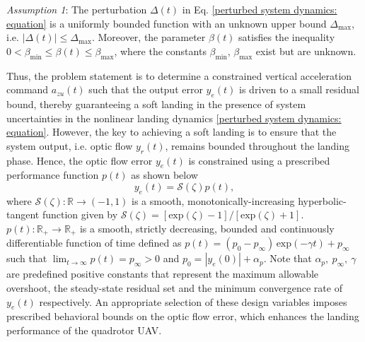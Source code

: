 \documentclass{IEEEtaes}
\begin{document}
\textit{Assumption 1}: The perturbation $\Delta(t)$ in Eq. \eqref{perturbed system dynamics: equation} is a uniformly bounded function with an unknown upper bound $\Delta_{\text{max}}$, i.e. $\lvert \Delta(t) \rvert \leq \Delta_{\text{max}}$.  Moreover, the parameter $\beta(t)$ satisfies the inequality $0 < \beta_{\text{min}} \leq\beta(t)\leq \beta_{\text{max}}$, where the constants $\beta_{\text{min}},\,\beta_{\text{max}}$ exist but are unknown.

Thus, the problem statement is to determine a constrained vertical acceleration command $a_{zu}(t)$ such that the output error $y_e(t)$ is driven to a small residual bound, thereby guaranteeing a soft landing in the presence of system uncertainties in the nonlinear landing dynamics \eqref{perturbed system dynamics: equation}. 
However, the key to achieving a soft landing is to ensure that the system output, i.e. optic flow $y_r(t)$, remains bounded throughout the landing phase.
Hence, the optic flow error $y_e(t)$ is constrained using a prescribed performance function $p(t)$ as shown below
\begin{equation}
    \label{error transformation: equation}
    y_e(t) = \mathcal{S}(\zeta) p(t),
\end{equation}
where $\mathcal{S}(\zeta): \mathbb{R} \rightarrow ({-}1, 1)$ is a smooth, monotonically-increasing hyperbolic-tangent function given by $\mathcal{S}(\zeta) = [\text{exp}(\zeta){-}1]/[\text{exp}(\zeta){+}1]$. $p(t): \mathbb{R}_+ \rightarrow \mathbb{R}_+$ is a smooth, strictly decreasing, bounded and continuously differentiable function of time defined as $p(t) = (p_{0}{-}p_{\infty}) \, \text{exp}({-}\gamma t) + p_{\infty}$ such that $\lim_{t \to \infty} p(t) = p_{\infty} >0$ and $p_0=|y_e(0)|+\alpha_p$.  Note that $\alpha_p,~p_{\infty},~\gamma$ are predefined positive constants that represent the maximum allowable overshoot, the steady-state residual set and the minimum convergence rate of $y_e(t)$ respectively. An appropriate selection of these design variables imposes prescribed behavioral bounds on the optic flow error, which enhances the landing performance of the quadrotor UAV. 
\end{document}
